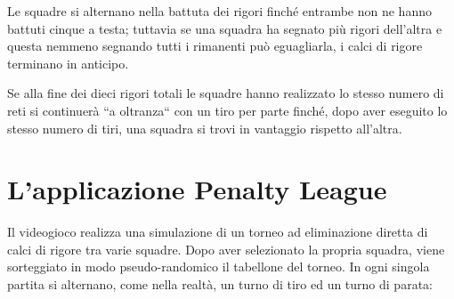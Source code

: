 \documentclass[12pt,a4paper]{report}
\begin{document}
Le squadre si alternano nella battuta dei rigori finché entrambe non ne hanno battuti cinque a testa; tuttavia se una squadra ha segnato più rigori dell'altra e questa nemmeno segnando tutti i rimanenti può eguagliarla, i calci di rigore terminano in anticipo.

Se alla fine dei dieci rigori totali le squadre hanno realizzato lo stesso numero di reti si continuerà ``a oltranza`` con un tiro per parte finché, dopo aver eseguito lo stesso numero di tiri, una squadra si trovi in vantaggio rispetto all'altra.
\newline
\newline



\section{L’applicazione Penalty League}\label{se:appPL}

Il videogioco realizza una simulazione di un torneo ad eliminazione diretta di calci di rigore tra varie squadre. Dopo aver selezionato la propria squadra, viene sorteggiato in modo pseudo-randomico il tabellone del torneo. In ogni singola partita si alternano, come nella realtà, un turno di tiro ed un turno di parata:
\end{document}
